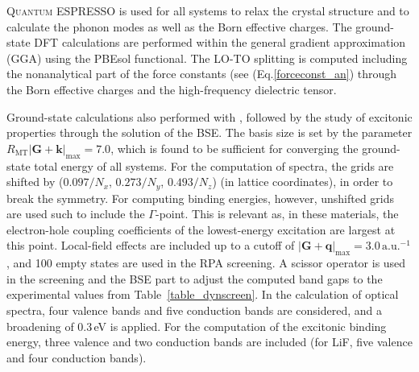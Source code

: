 \textsc{Q\!u\!a\!n\!t\!u\!m} ESPRESSO is used for all systems to relax the crystal structure and to calculate the phonon modes as well as the Born effective charges. The ground-state  DFT calculations are performed within the general gradient approximation (GGA) using the PBEsol functional\cite{pbesol}. The LO-TO splitting is computed including the nonanalytical part of the force constants  (see (Eq.\;\eqref{forceconst_an}) through the Born effective charges and the high-frequency dielectric tensor.\par
Ground-state calculations also performed with \exciting{}, followed by the study of excitonic properties  through the solution of the BSE. The basis size is set by the parameter $R_\text{MT}|\mathbf{G+k}|_\text{max} = 7.0$, which is found to be sufficient for converging the ground-state total energy of all systems. For the computation of spectra, the grids are shifted by  ($0.097/N_x$, $0.273/N_y$, $0.493/N_z$) (in lattice coordinates), in order to break the symmetry.  For computing binding energies, however, unshifted grids are used such to include the $\Gamma$-point. This is relevant as, in these materials, the electron-hole coupling coefficients of the lowest-energy excitation are largest at this point. Local-field effects are included up to a cutoff of $|\mathbf{G+q}|_\text{max}=3.0\,\text{a.u.}^{-1}$, and 100 empty states are used in the RPA screening. A scissor operator is used in the screening and the BSE part to adjust the computed band gaps to the experimental values from Table~\ref{table_dynscreen}. In the calculation of optical spectra, four valence bands and five conduction bands are considered, and a broadening of 0.3\,eV is applied. For the computation of the excitonic binding energy, three valence and two conduction bands are included (for LiF, five valence and four conduction bands).\par
%
